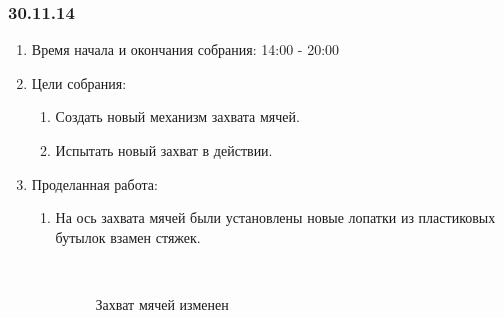 \subsubsection{30.11.14}

\begin{enumerate}
	\item Время начала и окончания собрания:
	14:00 - 20:00
	\item Цели собрания:
	\begin{enumerate}
		\item Создать новый механизм захвата мячей.
		
		\item Испытать новый захват в действии.
		
	\end{enumerate}
	\item Проделанная работа:
	\begin{enumerate}
		\item На ось захвата мячей были установлены новые лопатки из пластиковых бутылок взамен стяжек.
		
		\begin{figure}[H]
			\begin{minipage}[h]{0.2\linewidth}
				\center  
			\end{minipage}
			\begin{minipage}[h]{0.6\linewidth}
				\caption{Захват мячей изменен}
			\end{minipage}
		\end{figure}
		

\end{enumerate}
\end{enumerate}
